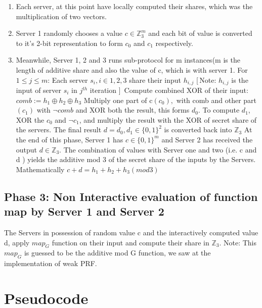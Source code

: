 \documentclass[11pt]{article}
\begin{document}
\begin{enumerate}
	\item Each server, at this point have locally computed their shares, which was the multiplication of two vectors.
	\item Server 1 randomly chooses a value $c \in \mathbb{Z}_{3}^{m}$ and each bit of value is converted to it's 2-bit representation to form $c_{0}$ and $c_{1}$ respectively. 
	\item Meanwhile, Server 1, 2 and 3 runs sub-protocol for m instances(m is the length of additive share and also the value of c, which is with server 1.
	\subitem For $1 \leq j \leq m$:
	\subitem Each server $s_{i} , i \in {1,2,3}$ share their input $h_{i,j}$ [\,Note: $h_{i,j}$ is the input of server $s_{i}$ in $j^{th}$ iteration ]\,
	\subitem Compute combined XOR of their input: $comb := h_{1} \oplus h_{2} \oplus h_{3}$
	\subitem Multiply one part of c$(c_{0}),$ with comb and other part $(c_{1})$ with $\neg{comb}$ and XOR both the result, this forms $d_{0}$.
	\subitem To compute $d_{1}$, XOR the $c_{0}$ and $\neg{c_{1}}$, and multiply the result with the XOR of secret share of the servers.
	\subitem The final result $d = d_{0}, d_{1} \in \{ 0,1\}^{2}$ is converted back into $\mathbb{Z}_{3}$
	\subitem At the end of this phase, Server 1 has $c \in \{0,1\}^m$ and Server 2 has received the output $d \in \mathbb{Z}_{3}$. The combination of values with Server one and two (i.e. c and d ) yields the additive mod 3 of the secret share of the inputs by the Servers. Mathematically $c + d = h_{1} + h_{2} + h_{3} (mod 3)$
\end{enumerate}

\subsection{Phase 3: Non Interactive evaluation of function map by Server 1 and Server 2}
The Servers in possession of random value c and the interactively computed value d, apply $map_{G}$ function on their input and compute their share in $\mathbb{Z}_3$. Note: This $map_{G}$ is guessed to be the additive mod G function, we saw at the implementation of weak PRF.

\section{Pseudocode}
\end{document}
